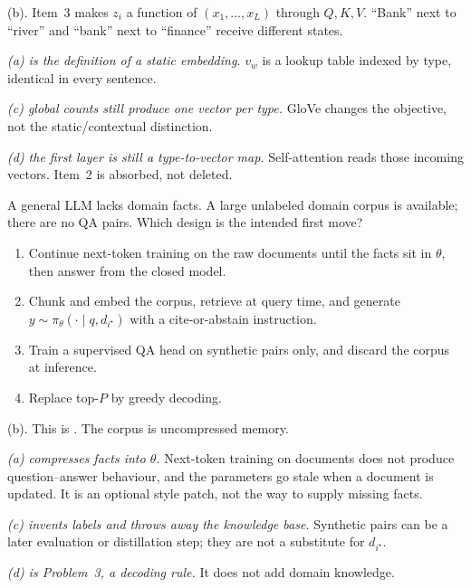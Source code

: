 \begin{solution}
(b). Item~3 makes $z_i$ a function of $(x_1,\dots,x_L)$ through $Q,K,V$. ``Bank'' next to ``river'' and ``bank'' next to ``finance'' receive different states.

\textit{(a) is the definition of a static embedding.}
$v_w$ is a lookup table indexed by type, identical in every sentence.

\textit{(c) global counts still produce one vector per type.}
GloVe changes the objective, not the static/contextual distinction.

\textit{(d) the first layer is still a type-to-vector map.}
Self-attention reads those incoming vectors. Item~2 is absorbed, not deleted.
\end{solution}

\begin{exercise}
\label{ex:nlpu-finetune-vs-rag}
A general LLM lacks domain facts. A large unlabeled domain corpus is available; there are no QA pairs. Which design is the intended first move?
\begin{enumerate}[label=(\alph*)]
    \item Continue next-token training on the raw documents until the facts sit in $\theta$, then answer from the closed model.
    \item Chunk and embed the corpus, retrieve at query time, and generate $y\sim\pi_\theta(\cdot\mid q,d_{i^\star})$ with a cite-or-abstain instruction.
    \item Train a supervised QA head on synthetic pairs only, and discard the corpus at inference.
    \item Replace top-$P$ by greedy decoding.
\end{enumerate}
\end{exercise}

\begin{solution}
(b). This is . The corpus is uncompressed memory.

\textit{(a) compresses facts into $\theta$.}
Next-token training on documents does not produce question--answer behaviour, and the parameters go stale when a document is updated. It is an optional style patch, not the way to supply missing facts.

\textit{(c) invents labels and throws away the knowledge base.}
Synthetic pairs can be a later evaluation or distillation step; they are not a substitute for $d_{i^\star}$.

\textit{(d) is Problem~3, a decoding rule.}
It does not add domain knowledge.
\end{solution}

